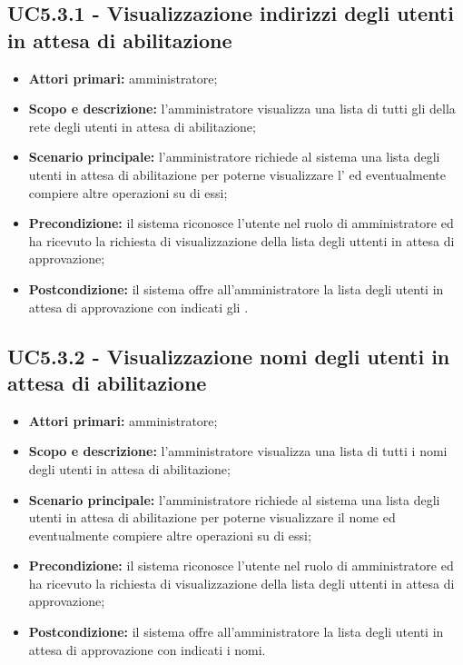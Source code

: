 \documentclass[AnalisiDeiRequisiti.tex]{subfiles}
\begin{document}
\subsection{UC5.3.1 - Visualizzazione indirizzi degli utenti in attesa di abilitazione}
\begin{itemize}
	\item \textbf{Attori primari:} amministratore;
	\item \textbf{Scopo e descrizione:} l'amministratore visualizza una lista di tutti gli  della rete  degli utenti in attesa di abilitazione;
	\item \textbf{Scenario principale:} l'amministratore richiede al sistema una lista degli utenti in attesa di abilitazione per poterne visualizzare l' ed eventualmente compiere altre operazioni su di essi;
	\item \textbf{Precondizione:} il sistema riconosce l'utente nel ruolo di amministratore ed ha ricevuto la richiesta di visualizzazione della lista degli uttenti in attesa di approvazione;
	\item \textbf{Postcondizione:} il sistema offre all'amministratore la lista degli utenti in attesa di approvazione con indicati gli .
\end{itemize}
\subsection{UC5.3.2 - Visualizzazione nomi degli utenti in attesa di abilitazione}
\begin{itemize}
	\item \textbf{Attori primari:} amministratore;
	\item \textbf{Scopo e descrizione:} l'amministratore visualizza una lista di tutti i nomi degli utenti in attesa di abilitazione;
	\item \textbf{Scenario principale:} l'amministratore richiede al sistema una lista degli utenti in attesa di abilitazione per poterne visualizzare il nome ed eventualmente compiere altre operazioni su di essi;
	\item \textbf{Precondizione:} il sistema riconosce l'utente nel ruolo di amministratore ed ha ricevuto la richiesta di visualizzazione della lista degli uttenti in attesa di approvazione;
	\item \textbf{Postcondizione:} il sistema offre all'amministratore la lista degli utenti in attesa di approvazione con indicati i nomi.
\end{itemize}
\end{document}
